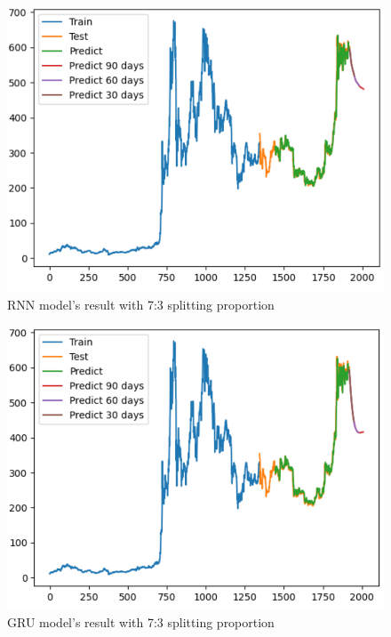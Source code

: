 \documentclass{ieeeojies}
\begin{document}
\begin{figure}[H]
	\centering
	\begin{minipage}{0.8\linewidth}
		\centering
		\includegraphics[width=\linewidth]{bibliography/Images/RNN_BNB_73.PNG}
		\caption{RNN model's result with 7:3 splitting proportion}
	\end{minipage}
\end{figure}
\begin{figure}[H]
	\centering
	\begin{minipage}{0.8\linewidth}
		\centering
		\includegraphics[width=\linewidth]{bibliography/Images/GRU_BNB_73.PNG}
		\caption{GRU model's result with 7:3 splitting proportion}
	\end{minipage}
\end{figure}
\end{document}
